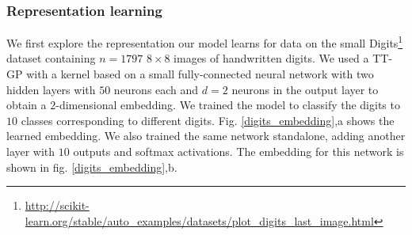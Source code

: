   \subsubsection{Representation learning}
  We first explore the representation our model learns for data on the small
  Digits\footnote{\url{http://scikit-learn.org/stable/auto_examples/datasets/plot_digits_last_image.html}}
  dataset containing $n = 1797$ $8 \times 8$ images of handwritten digits. We
  used a TT-GP with a kernel based on a small fully-connected neural network
  with two hidden layers with $50$ neurons each and $d = 2$ neurons in the output
  layer to obtain a $2$-dimensional embedding. We trained the model to classify
  the digits to $10$ classes corresponding to different digits.
  Fig. \ref{digits_embedding},a shows the learned embedding. We also trained the same
  network standalone, adding another layer with $10$ outputs and softmax
  activations. The embedding for this network is shown in fig. \ref{digits_embedding},b.
